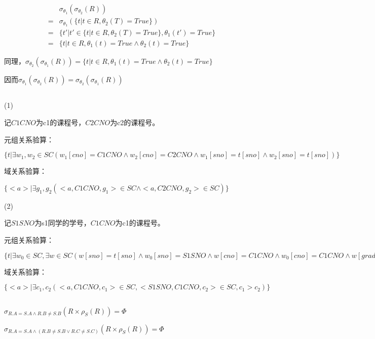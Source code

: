 \documentclass[UTF8]{ctexart}
\begin{document}
\[
\begin{aligned}
    &\sigma_{\theta_1}(\sigma_{\theta_2}(R))\\
    = &\sigma_{\theta_1}(\{t | t\in R, \theta_2(T) = True\})\\
    = &\{t' | t'\in \{t | t\in R, \theta_2(T) = True\}, \theta_1(t') = True\}\\
    = &\{t | t\in R, \theta_1(t) = True\land \theta_2(t) = True\}
\end{aligned}
\]

同理，$\sigma_{\theta_2}(\sigma_{\theta_1}(R)) = \{t | t\in R, \theta_1(t) = True\land \theta_2(t) = True\}$

因而$\sigma_{\theta_1}(\sigma_{\theta_2}(R)) = \sigma_{\theta_2}(\sigma_{\theta_1}(R))$

\subsection{}

(1)

记$C1CNO$为c1的课程号，$C2CNO$为c2的课程号。

元组关系验算：

$\{t | \exists w_1, w_2\in SC(w_1[cno] = C1CNO\land w_2[cno] = C2CNO\land w_1[sno] = t[sno]\land w_2[sno] = t[sno])\}$

域关系验算：

$\{<a> | \exists g_1, g_2(<a, C1CNO, g_1>\in SC\land <a, C2CNO, g_2>\in SC)\}$

(2)

记$S1SNO$为s1同学的学号，$C1CNO$为c1的课程号。

元组关系验算：

$\{t | \exists w_0\in SC, \exists w\in SC(w[sno] = t[sno]\land w_0[sno] = S1SNO\land w[cno] = C1CNO\land w_0[cno] = C1CNO\land w[grade] > w_0[grade])\}$

域关系验算：

$\{<a> | \exists c_1, c_2(<a, C1CNO, c_1>\in SC, <S1SNO, C1CNO, c_2>\in SC, c_1 > c_2)\}$

\subsection{}

$\sigma_{R.A = S.A\land R.B\neq S.B}(R\times \rho_S(R)) = \Phi$

$\sigma_{R.A = S.A\land (R.B\neq S.B\lor R.C\neq S.C)}(R\times \rho_S(R)) = \Phi$
\end{document}

